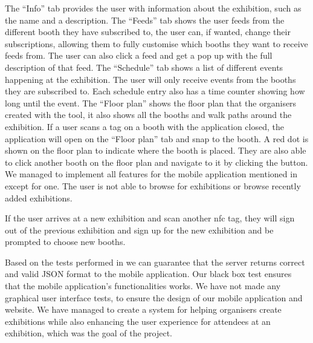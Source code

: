 The ``Info'' tab provides the user with information about the exhibition, such as the name and a description. The ``Feeds'' tab shows the user feeds from the different booth they have subscribed to, the user can, if wanted, change their subscriptions, allowing them to fully customise which booths they want to receive feeds from. The user can also click a feed and get a pop up with the full description of that feed. The ``Schedule'' tab shows a list of different events happening at the exhibition. The user will only receive events from the booths they are subscribed to. Each schedule entry also has a time counter showing how long until the event. The ``Floor plan'' shows the floor plan that the organisers created with the tool, it also shows all the booths and walk paths around the exhibition. If a user scans a tag on a booth with the application closed, the application will open on the ``Floor plan'' tab and snap to the booth. A red dot is shown on the floor plan to indicate where the booth is placed. They are also able to click another booth on the floor plan and navigate to it by clicking the button. We managed to implement all features for the mobile application mentioned in  except for one. The user is not able to browse for exhibitions or browse recently added exhibitions.

If the user arrives at a new exhibition and scan another \ac{nfc} tag, they will sign out of the previous exhibition and sign up for the new exhibition and be prompted to choose new booths. 

Based on the tests performed in  we can guarantee that the server returns correct and valid JSON format to the mobile application. Our black box test ensures that the mobile application's functionalities works. We have not made any graphical user interface tests, to ensure the design of our mobile application and website. We have managed to create a system for helping organisers create exhibitions while also enhancing the user experience for attendees at an exhibition, which was the goal of the project.